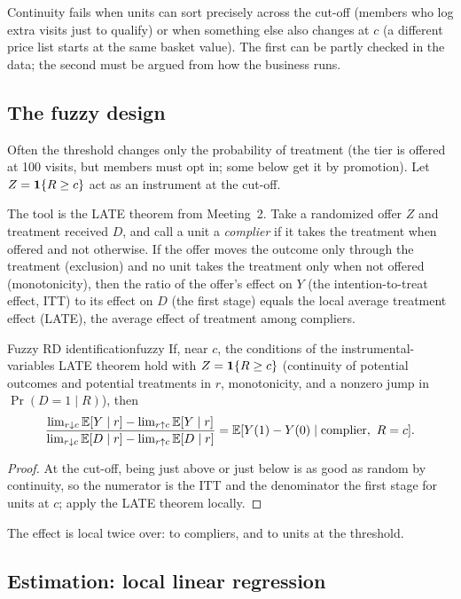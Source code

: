 \documentclass[11pt]{article}
\begin{document}
Continuity fails when units can sort precisely across the cut-off (members who log extra visits just to qualify) or when something else
also changes at $c$ (a different price list starts at the same basket value). The first can be partly checked in the data; the second must be
argued from how the business runs.

\subsection{The fuzzy design}

Often the threshold changes only the probability of treatment (the tier is offered at 100 visits, but members must opt in; some below get it by
promotion). Let $Z = \mathbf{1}\{R \ge c\}$ act as an instrument at the cut-off.

The tool is the LATE theorem from Meeting~2. Take a randomized offer $Z$ and treatment received $D$, and call a unit a
\emph{complier} if it takes the treatment when offered and not otherwise. If the offer moves the outcome only through the
treatment (exclusion) and no unit takes the treatment only when not offered (monotonicity), then the ratio of the offer's effect on $Y$
(the intention-to-treat effect, ITT) to its effect on $D$ (the first stage) equals the local average treatment effect (LATE), the
average effect of treatment among compliers.

\begin{prop}{Fuzzy RD identification}{fuzzy}
If, near $c$, the conditions of the instrumental-variables LATE theorem hold with $Z = \mathbf{1}\{R \ge c\}$ (continuity of potential outcomes and potential
treatments in $r$, monotonicity, and a nonzero jump in $\Pr(D = 1 \mid R)$), then
\[
  \frac{\lim_{r \downarrow c}\mathbb{E}[Y \mid r] - \lim_{r \uparrow c}\mathbb{E}[Y \mid r]}{\lim_{r \downarrow c}\mathbb{E}[D \mid r] - \lim_{r \uparrow c}\mathbb{E}[D \mid r]}
  = \mathbb{E}[Y(1) - Y(0) \mid \text{complier},\ R = c] .
\]
\end{prop}
\begin{proof}
At the cut-off, being just above or just below is as good as random by continuity, so the numerator is the ITT and the denominator the first stage
for units at $c$; apply the LATE theorem locally.
\end{proof}

The effect is local twice over: to compliers, and to units at the threshold.

\subsection{Estimation: local linear regression}
\end{document}
